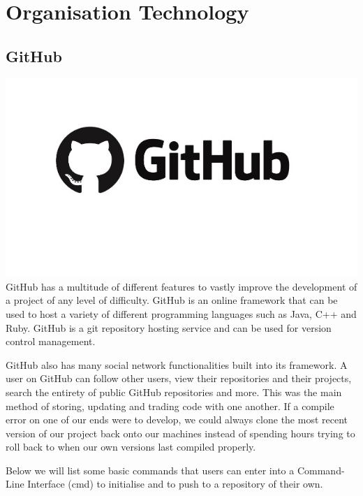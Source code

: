 \section{Organisation Technology}

\subsection{GitHub}
\includegraphics[scale=0.7]{img/github-logo.jpg}
GitHub has a multitude of different features to vastly improve the development of a project of any level of difficulty. GitHub is an online framework that can be used to host a variety of different programming languages such as Java, C++ and Ruby. GitHub is a git repository hosting service and can be used for version control management. \par
GitHub also has many social network functionalities built into its framework. A user on GitHub can follow other users, view their repositories and their projects, search the entirety of public GitHub repositories and more. This was the main method of storing, updating and trading code with one another. If a compile error on one of our ends were to develop, we could always clone the most recent version of our project back onto our machines instead of spending hours trying to roll back to when our own versions last compiled properly. \par
Below we will list some basic commands that users can enter into a Command-Line Interface (cmd) to initialise and to push to a repository of their own.
